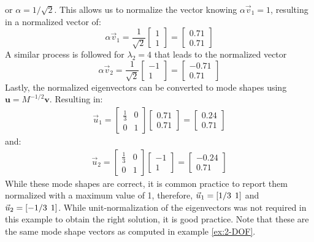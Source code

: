 \documentclass[12pt,letter]{article}
\begin{document}
\begin{example}
\begin{equation}
	\end{equation}
	or $\alpha = 1/\sqrt{2}$. This allows us to normalize the vector knowing $\alpha \vec{v}_1=1$, resulting in a normalized vector of:
	\begin{equation}
	\alpha \vec{v}_1=  \frac{1}{\sqrt{2}} \begin{bmatrix} 1 \\ 1 \end{bmatrix}  =  \begin{bmatrix} 0.71 \\ 0.71 \end{bmatrix} 
	\end{equation} 
	A similar process is followed for $\lambda_2=4$ that leads to the normalized vector 
	\begin{equation}
	\alpha \vec{v}_2=  \frac{1}{\sqrt{2}} \begin{bmatrix} -1 \\ 1 \end{bmatrix} =  \begin{bmatrix} -0.71 \\ 0.71 \end{bmatrix} 
	\end{equation} 
	Lastly, the normalized eigenvectors can be converted to mode shapes using $\textbf{u} = M^{-1/2}\textbf{v}$. Resulting in: 
	\begin{eqnarray}
	\vec{u}_1 =  \begin{bmatrix} \frac{1}{3} & 0  \\  0 & 1 \end{bmatrix}   \begin{bmatrix} 0.71 \\ 0.71 \end{bmatrix} =  \begin{bmatrix} 0.24 \\  0.71 \end{bmatrix}
	\end{eqnarray}
	and:
	\begin{eqnarray}
	\vec{u}_2 =  \begin{bmatrix} \frac{1}{3} & 0  \\  0 & 1 \end{bmatrix}   \begin{bmatrix} -1 \\  1 \end{bmatrix} =  \begin{bmatrix} -0.24 \\  0.71 \end{bmatrix}
	\end{eqnarray}
	While these mode shapes are correct, it is common practice to report them normalized with a maximum value of 1, therefore, $\vec{u}_1 = [1/3 \hspace{1ex} 1]$ and $\vec{u}_2 = [-1/3 \hspace{1ex} 1]$. While unit-normalization of the eigenvectors was not required in this example to obtain the right solution, it is good practice. Note that these are the same mode shape vectors as computed in example \ref{ex:2-DOF}.
	
	\end{example}
	
\end{document}
